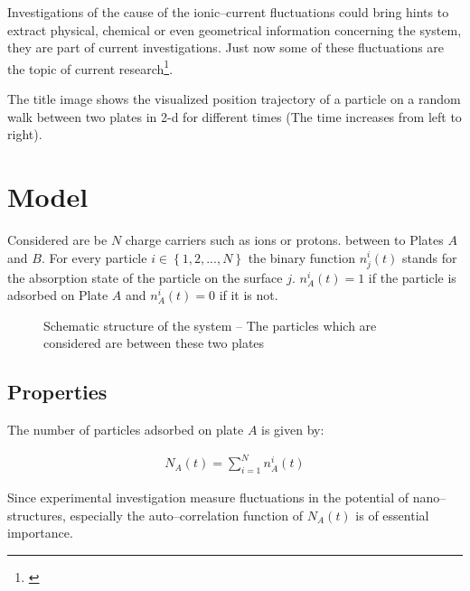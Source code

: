 \documentclass[a4paper, parskip=half]{scrartcl}
\newcommand{\myCite}[1]{\footnote{\cite{#1} \citeauthor{#1} \citetitle{#1} \citeyear{#1}}}
\begin{document}
Investigations of the cause of the ionic--current fluctuations could bring hints to extract physical, chemical or even geometrical information concerning the system, they are part of current investigations. Just now some of these fluctuations are the topic of current research\myCite{paper2}. 

The title image shows the visualized position trajectory of a particle on a random walk between two plates in 2-d for different times (The time increases from left to right).


\newpage

\section{Model}
Considered are be $N$ charge carriers such as ions or protons. between to Plates $A$ and $B$. For every particle $i\in\left\lbrace 1,2,...,N \right\rbrace$ the binary function $n_j^i(t)$ stands for the absorption state of the particle on the surface $j$. $n_A^i(t) = 1$ if the particle is adsorbed on Plate $A$ and $n_A^i(t) = 0$ if it is not.

\begin{figure}[H]
\centering
{}
\caption{Schematic structure of the system -- The particles which are considered are between these two plates}
\end{figure}
\subsection{Properties}
The number of particles adsorbed on plate $A$ is given by:

\begin{align}
N_A(t) = \sum_{i=1}^N n_A^i(t)
\end{align}

Since experimental investigation measure fluctuations in the potential of nano--structures, especially the auto--correlation function of $N_A(t)$ is of essential importance.
\end{document}
